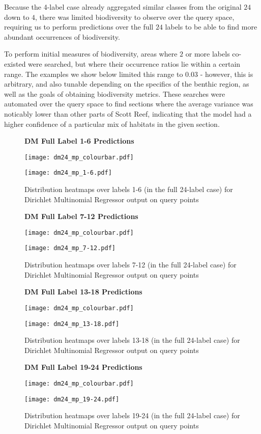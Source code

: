 Because the 4-label case already aggregated similar classes from the original $24$ down to $4$, there was limited biodiversity to observe over the query space, requiring us to perform predictions over the full $24$ labels to be able to find more abundant occurrences of biodiversity.

To perform initial measures of biodiversity, areas where $2$ or more labels co-existed were searched, but where their occurrence ratios lie within a certain range. The examples we show below limited this range to $0.03$ - however, this is arbitrary, and also tunable depending on the specifics of the benthic region, as well as the goals of obtaining biodiversity metrics. These searches were automated over the query space to find sections where the average variance was noticably lower than other parts of Scott Reef, indicating that the model had a higher confidence of a particular mix of habitats in the given section.

\begin{figure}[H]
    \textbf{DM Full Label 1-6 Predictions}
    \centerline{\texttt{[image: dm24\_mp\_colourbar.pdf]}}
    \centerline{\texttt{[image: dm24\_mp\_1-6.pdf]}}
    \caption{Distribution heatmaps over labels 1-6 (in the full 24-label case) for Dirichlet Multinomial Regressor output on query points}
    \label{fig:dm_24-1_label_heatmap}
    \hfill
\end{figure}

\begin{figure}[H]
    \textbf{DM Full Label 7-12 Predictions}
    \centerline{\texttt{[image: dm24\_mp\_colourbar.pdf]}}
    \centerline{\texttt{[image: dm24\_mp\_7-12.pdf]}}
    \caption{Distribution heatmaps over labels 7-12 (in the full 24-label case) for Dirichlet Multinomial Regressor output on query points}
    \label{fig:dm_24-2_label_heatmap}
    \hfill
\end{figure}

\begin{figure}[H]
    \textbf{DM Full Label 13-18 Predictions}
    \centerline{\texttt{[image: dm24\_mp\_colourbar.pdf]}}
    \centerline{\texttt{[image: dm24\_mp\_13-18.pdf]}}
    \caption{Distribution heatmaps over labels 13-18 (in the full 24-label case) for Dirichlet Multinomial Regressor output on query points}
    \label{fig:dm_24-3_label_heatmap}
    \hfill
\end{figure}

\begin{figure}[H]
    \textbf{DM Full Label 19-24 Predictions}
    \centerline{\texttt{[image: dm24\_mp\_colourbar.pdf]}}
    \centerline{\texttt{[image: dm24\_mp\_19-24.pdf]}}
    \caption{Distribution heatmaps over labels 19-24 (in the full 24-label case) for Dirichlet Multinomial Regressor output on query points}
    \label{fig:dm_24-4_label_heatmap}
    \hfill
\end{figure}


